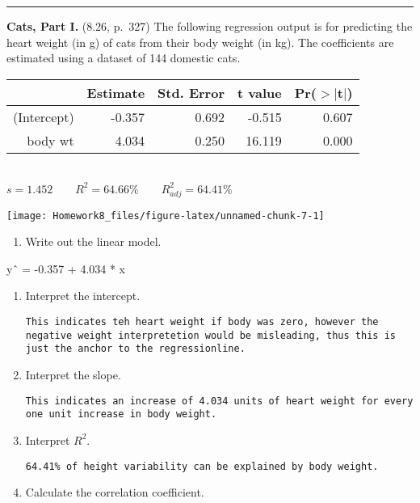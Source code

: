 \documentclass[]{article}
\providecommand{\tightlist}{%
  \setlength{\itemsep}{0pt}\setlength{\parskip}{0pt}}
\begin{document}
\begin{center}\rule{0.5\linewidth}{\linethickness}\end{center}

\clearpage

\textbf{Cats, Part I.} (8.26, p.~327) The following regression output is
for predicting the heart weight (in g) of cats from their body weight
(in kg). The coefficients are estimated using a dataset of 144 domestic
cats.

\begin{center}
{
\begin{tabular}{rrrrr}
    \hline
            & Estimate  & Std. Error    & t value   & Pr($>$$|$t$|$) \\ 
    \hline
(Intercept) & -0.357    & 0.692         & -0.515    & 0.607 \\ 
body wt     & 4.034     & 0.250         & 16.119    & 0.000 \\ 
    \hline
\end{tabular} \ \\
$s = 1.452 \qquad R^2 = 64.66\% \qquad R^2_{adj} = 64.41\%$ 
}
\end{center}

\begin{center}

\texttt{[image: Homework8\_files/figure-latex/unnamed-chunk-7-1]} 
\end{center}

\begin{enumerate}
\def\labelenumi{(\alph{enumi})}
\tightlist
\item
  Write out the linear model.
\end{enumerate}

yˆ = -0.357 + 4.034 * x

\begin{enumerate}
\def\labelenumi{(\alph{enumi})}
\setcounter{enumi}{1}
\item
  Interpret the intercept.

\begin{verbatim}
This indicates teh heart weight if body was zero, however the negative weight interpretetion would be misleading, thus this is just the anchor to the regressionline.
\end{verbatim}
\item
  Interpret the slope.

\begin{verbatim}
This indicates an increase of 4.034 units of heart weight for every one unit increase in body weight.
\end{verbatim}
\item
  Interpret \(R^2\).

\begin{verbatim}
64.41% of height variability can be explained by body weight.
\end{verbatim}
\item
  Calculate the correlation coefficient.
\end{enumerate}
\end{document}
